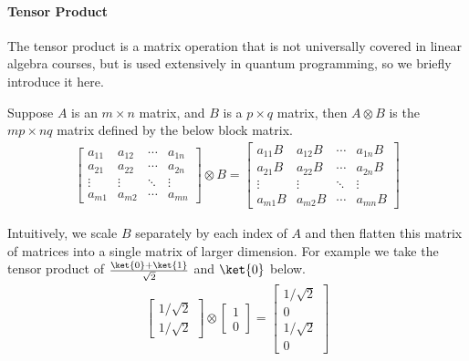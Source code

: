 \paragraph{Tensor Product}
The tensor product is a matrix operation that is not universally covered in linear algebra courses, but is used extensively in quantum programming, so we briefly introduce it here.
\begin{definition}
Suppose $A$ is an $m \times n$ matrix, and $B$ is a $p\times q$ matrix, then $A\otimes B$ is the $mp \times nq$ matrix defined by the below block matrix.
\begin{align*}
    \begin{bmatrix}
        a_{11} & a_{12} & \cdots &a_{1n}\\
        a_{21} & a_{22} & \cdots &a_{2n}\\
        \vdots & \vdots & \ddots & \vdots \\
        a_{m1} & a_{m2} & \cdots & a_{mn}
    \end{bmatrix} 
    \otimes B = 
    \begin{bmatrix}
        a_{11}B & a_{12}B & \cdots &a_{1n}B\\
        a_{21}B & a_{22}B & \cdots &a_{2n}B\\
        \vdots & \vdots & \ddots & \vdots \\
        a_{m1}B & a_{m2}B & \cdots & a_{mn}B
    \end{bmatrix}
\end{align*}
\end{definition}
Intuitively, we scale $B$ separately by each index of $A$ and then flatten this matrix of matrices into a single matrix of larger dimension.
For example we take the tensor product of $\frac{\ket{0} + \ket{1}}{\sqrt{2}}$ and $\ket{0}$ below.
\begin{align*}
    \begin{bmatrix} 1 / \sqrt{2} \\ 1 / \sqrt{2} \end{bmatrix} \otimes \begin{bmatrix} 1 \\ 0 \end{bmatrix}   = 
\begin{bmatrix} 1 / \sqrt{2} \\ 0 \\ 1 / \sqrt{2}  \\ 0 \end{bmatrix}
\end{align*}
